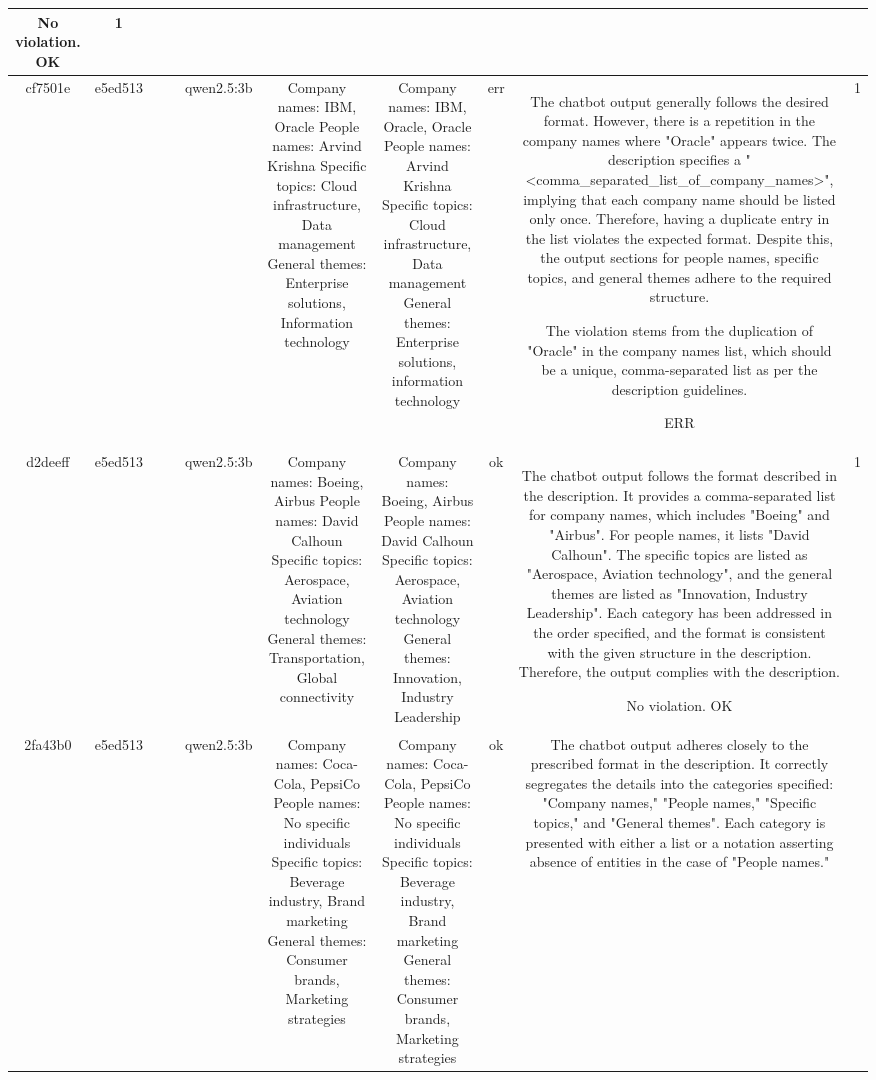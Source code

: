 \begin{table}[h!]
\begin{tabular}{|c|c|c|c|c|c|c|c|c|c|}
No violation.
OK & 1\\
\hline
cf7501e & e5ed513 &  &  & qwen2.5:3b & Company names: IBM, Oracle
People names: Arvind Krishna
Specific topics: Cloud infrastructure, Data management
General themes: Enterprise solutions, Information technology & Company names: IBM, Oracle, Oracle
People names: Arvind Krishna
Specific topics: Cloud infrastructure, Data management
General themes: Enterprise solutions, information technology & err & The chatbot output generally follows the desired format. However, there is a repetition in the company names where "Oracle" appears twice. The description specifies a "<comma_separated_list_of_company_names>", implying that each company name should be listed only once. Therefore, having a duplicate entry in the list violates the expected format. Despite this, the output sections for people names, specific topics, and general themes adhere to the required structure.

The violation stems from the duplication of "Oracle" in the company names list, which should be a unique, comma-separated list as per the description guidelines.

ERR & 1\\
\hline
d2deeff & e5ed513 &  &  & qwen2.5:3b & Company names: Boeing, Airbus
People names: David Calhoun
Specific topics: Aerospace, Aviation technology
General themes: Transportation, Global connectivity & Company names: Boeing, Airbus
People names: David Calhoun
Specific topics: Aerospace, Aviation technology
General themes: Innovation, Industry Leadership & ok & The chatbot output follows the format described in the description. It provides a comma-separated list for company names, which includes "Boeing" and "Airbus". For people names, it lists "David Calhoun". The specific topics are listed as "Aerospace, Aviation technology", and the general themes are listed as "Innovation, Industry Leadership". Each category has been addressed in the order specified, and the format is consistent with the given structure in the description. Therefore, the output complies with the description.

No violation.
OK & 1\\
\hline
2fa43b0 & e5ed513 &  &  & qwen2.5:3b & Company names: Coca-Cola, PepsiCo
People names: No specific individuals
Specific topics: Beverage industry, Brand marketing
General themes: Consumer brands, Marketing strategies & Company names: Coca-Cola, PepsiCo
People names: No specific individuals
Specific topics: Beverage industry, Brand marketing
General themes: Consumer brands, Marketing strategies & ok & The chatbot output adheres closely to the prescribed format in the description. It correctly segregates the details into the categories specified: "Company names," "People names," "Specific topics," and "General themes". Each category is presented with either a list or a notation asserting absence of entities in the case of "People names."


\end{tabular}
\end{table}
